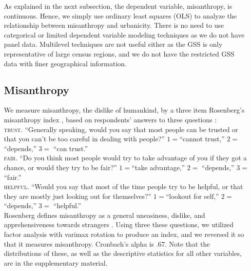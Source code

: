 \documentclass[11pt, letterpaper]{article}
\begin{document}
\begin{spacing}{1.4}
As explained in the next subsection, the dependent variable, misanthropy, is continuous. Hence, we simply use ordinary least squares (OLS) to analyze the relationship between misanthropy and urbanicity.
{There is no need to use categorical or limited dependent variable modeling techniques as we do not have panel data. Multilevel techniques are not useful either as the GSS is only representative of large census regions, and we do not have the restricted GSS data with finer geographical information.} 

\subsection*{Misanthropy}

We measure misanthropy, the dislike of humankind, by a three item  Rosenberg's  misanthropy index \citep{rosenberg56}, based on respondents' answers to three questions \citep{smith97}:\\

\indent\textsc{trust}. ``Generally speaking, would you say that most people can be trusted or that you can't be too
careful in dealing with people?''  $1=$``cannot trust,'' $2=$     ``depends,'' $3=$   ``can trust.''\\
\indent\textsc{fair}. ``Do you think most people would try to take advantage of you if they got a chance, or
would they try to be fair?'' $1=$``take advantage,'' $2=$       ``depends,'' $3=$          ``fair.'' \\
\indent\textsc{helpful}. ``Would you say that most of the time people try to be helpful, or that they are mostly just
looking out for themselves?'' $1=$``lookout for self,'' $2=$       ``depends,'' $3=$        ``helpful.''\\ 

Rosenberg defines misanthropy as a general uneasiness, dislike, and apprehensiveness towards strangers \citep{rosenberg56}. Using three these questions, we utilized factor analysis with varimax rotation to produce an index, and we reversed it so that it measures misanthropy. Cronbach's alpha is .67. Note that the distributions of these, as well as the descriptive statistics for all other variables, are in the supplementary material.


\end{spacing}
\end{document}

